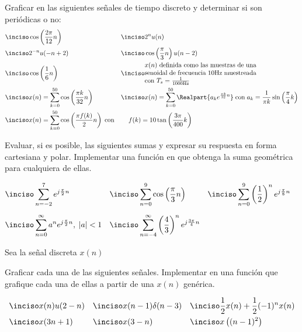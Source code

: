 \begin{ejercicio}
    Graficar en \Keyboardsym las siguientes señales de tiempo discreto y determinar si son periódicas o no:
    \begin{align*}
        \inciso & \cos\left(\frac{2\pi}{12} n\right) & \inciso & 2^n u(n) \\
        \inciso & 2^{-n} u(-n+2) & \inciso & \cos\left(\frac{\pi}{3} n \right) u(n-2) \\ 
        \inciso & \cos\left(\frac{1}{6} n\right) & \inciso & \parbox{.5\textwidth}{$x(n)$ definida como las muestras de una senoidal de frecuencia 10Hz muestreada con $T_s=\frac{1}{1000\mathrm{Hz}}$} \\
        \inciso & x(n) = \sum_{k=0}^{50}\cos\left(\frac{\pi k}{32}n\right) & \inciso & x(n) = \sum_{k=0}^{50} \Realpart{a_ke^{\frac{\pi k}{32}n}}\; \mathrm{con}\; a_k = \frac{1}{\pi k} \sin\left(\frac{\pi}{4} k\right)  \\ 
        \inciso & x(n) = \sum_{k=0}^{50}\cos\left(\frac{\pi f(k)}{2}n\right)\; \mathrm{con} & & \hspace{-2.5em} f(k) = 10 \tan\left(\frac{3\pi}{400} k\right)
    \end{align*}

\end{ejercicio}

\begin{ejercicio}
Evaluar, si es posible, las siguientes sumas y expresar su respuesta en forma cartesiana y polar. Implementar una función en \Keyboardsym que obtenga la suma geométrica para cualquiera de ellas. 

\begin{align*}
\inciso & \sum_{n=-2}^7 e^{j\frac{\pi}{2}n} & 
\inciso & \sum_{n=0}^9 \cos\left(\frac{\pi}{3}n\right) &
\inciso & \sum_{n=0}^9 \left(\frac{1}{2}\right)^n e^{j\frac{\pi}{8}n} & \hfill \\[.5em]
\inciso & \sum_{n=0}^\infty a^n e^{j\frac{\pi}{2}n},\; |a| < 1 & 
\inciso & \sum_{n=-4}^\infty \left(\frac{4}{3}\right)^n e^{j\frac{3\pi}{4}n} &
\end{align*}
\end{ejercicio}

\begin{ejercicio}
Sea la señal discreta $x(n)$
\begin{center}
    
\end{center}

Graficar cada una de las siguientes señales. Implementar en \Keyboardsym una función que grafique cada una de ellas a partir de una $x(n)$ genérica.

\begin{align*}
    \inciso & x(n) u(2-n) & 
    \inciso & x(n-1) \delta(n-3) & 
    \inciso & \frac{1}{2}x(n) + \frac{1}{2}(-1)^n x(n) \\
    \inciso & x(3n + 1) &
    \inciso & x(3 - n) &
    \inciso & x\left((n-1)^2\right)
\end{align*}

\end{ejercicio}


